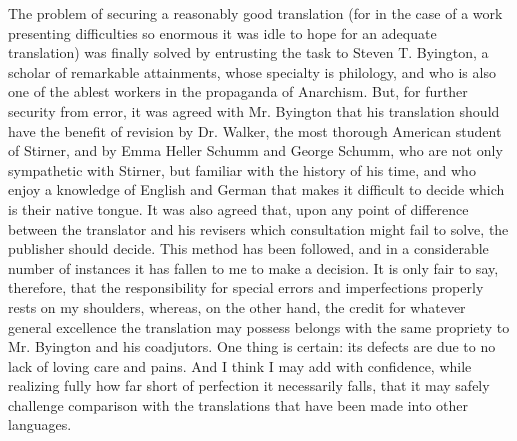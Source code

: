 The problem of securing a reasonably good translation (for in the case of a 
work presenting difficulties so enormous it was idle to hope for an adequate 
translation) was finally solved by entrusting the task to Steven T. Byington, 
a scholar of remarkable attainments, whose specialty is philology, and who is 
also one of the ablest workers in the propaganda of Anarchism. But, for 
further security from error, it was agreed with Mr. Byington that his 
translation should have the benefit of revision by Dr. Walker, the most 
thorough American student of Stirner, and by Emma Heller Schumm and George 
Schumm, who are not only sympathetic with Stirner, but familiar with the 
history of his time, and who enjoy a knowledge of English and German that 
makes it difficult to decide which is their native tongue. It was also agreed 
that, upon any point of difference between the translator and his revisers 
which consultation might fail to solve, the publisher should decide. This 
method has been followed, and in a considerable number of instances it has 
fallen to me to make a decision. It is only fair to say, therefore, that the 
responsibility for special errors and imperfections properly rests on my 
shoulders, whereas, on the other hand, the credit for whatever general 
excellence the translation may possess belongs with the same propriety to Mr. 
Byington and his coadjutors. One thing is certain: its defects are due to no 
lack of loving care and pains. And I think I may add with confidence, while 
realizing fully how far short of perfection it necessarily falls, that it may 
safely challenge comparison with the translations that have been made into 
other languages.

